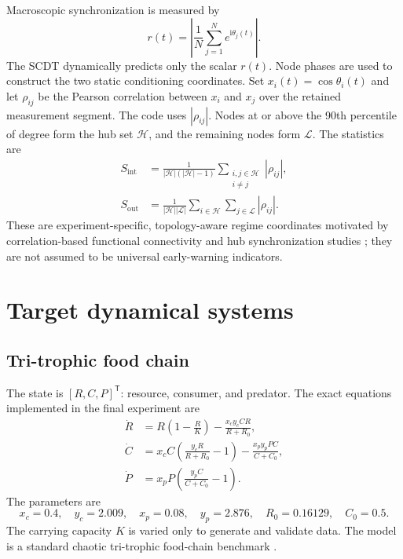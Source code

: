 \documentclass[10pt,a4paper]{article}
\begin{document}
Macroscopic synchronization is measured by
\begin{equation}
  r(t)=\left|\frac{1}{N}\sum_{j=1}^{N}e^{\mathrm{i}\theta_j(t)}\right|.
  \label{eq:order-parameter}
\end{equation}
The SCDT dynamically predicts only the scalar $r(t)$. Node phases are used to
construct the two static conditioning coordinates. Set
$x_i(t)=\cos\theta_i(t)$ and let $\rho_{ij}$ be the Pearson correlation between
$x_i$ and $x_j$ over the retained measurement segment. The code uses
$|\rho_{ij}|$. Nodes at or above the 90th percentile of degree form the hub set
$\mathcal H$, and the remaining nodes form $\mathcal L$. The statistics are
\begin{align}
  S_{\mathrm{int}}
  &=\frac{1}{|\mathcal H|(|\mathcal H|-1)}
    \sum_{\substack{i,j\in\mathcal H\\i\ne j}}|\rho_{ij}|,
  \label{eq:sint}\\
  S_{\mathrm{out}}
  &=\frac{1}{|\mathcal H||\mathcal L|}
    \sum_{i\in\mathcal H}\sum_{j\in\mathcal L}|\rho_{ij}|.
  \label{eq:sout}
\end{align}
These are experiment-specific, topology-aware regime coordinates motivated by
correlation-based functional connectivity and hub synchronization studies
\cite{Ziaeemehr2021,Pereira2010,Vlasov2017}; they are not assumed to be
universal early-warning indicators.

\section{Target dynamical systems}

\subsection{Tri-trophic food chain}

The state is $[R,C,P]^{\mathsf T}$: resource, consumer, and predator. The exact
equations implemented in the final experiment are
\begin{align}
  \dot R&=R\left(1-\frac{R}{K}\right)
  -\frac{x_c y_c C R}{R+R_0}, \\
  \dot C&=x_c C\left(\frac{y_cR}{R+R_0}-1\right)
  -\frac{x_p y_p P C}{C+C_0}, \\
  \dot P&=x_p P\left(\frac{y_pC}{C+C_0}-1\right).
  \label{eq:food}
\end{align}
The parameters are
\begin{equation}
  x_c=0.4,\quad y_c=2.009,\quad x_p=0.08,\quad y_p=2.876,
  \quad R_0=0.16129,\quad C_0=0.5.
\end{equation}
The carrying capacity $K$ is varied only to generate and validate data. The
model is a standard chaotic tri-trophic food-chain benchmark
\cite{McCann1994,Kong2021}.
\end{document}
